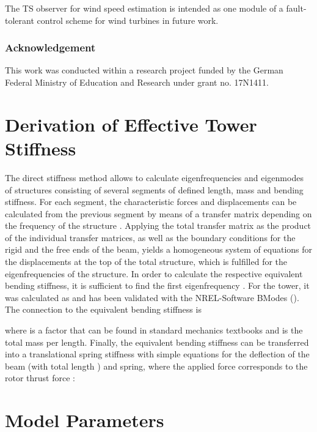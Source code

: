 \documentclass[a4paper]{article}
\begin{document}
The TS observer for wind speed estimation is intended as one module of a fault-tolerant control scheme for wind turbines in future work.





\subsubsection*{Acknowledgement}

This work was conducted within a research project funded by the German Federal Ministry of Education and Research under grant no. 17N1411.

\appendix

\section{\label{Sec_AppDirectStiffness}Derivation of Effective Tower Stiffness}

The direct stiffness method allows to calculate eigenfrequencies and eigenmodes of structures consisting of several segments of defined length, mass and bending stiffness. For each segment, the characteristic forces and displacements can be calculated from the previous segment by means of a transfer matrix depending on the frequency of the structure \cite{GaschKnothe2}. Applying the total transfer matrix as the product of the individual transfer matrices, as well as the boundary conditions for the rigid and the free ends of the beam, yields a homogeneous system of equations for the displacements at the top of the total structure, which is fulfilled for the eigenfrequencies of the structure.
In order to calculate the respective equivalent bending stiffness, it is sufficient to find the first eigenfrequency . For the tower, it was calculated as  and has been validated with the NREL-Software BModes \cite{BModes} (). The connection to the equivalent bending stiffness  is

where  is a factor that can be found in standard mechanics textbooks and  is the total mass per length.
Finally, the equivalent bending stiffness can be transferred into a translational spring stiffness with simple equations for the deflection  of the beam (with total length ) and spring, where the applied force  corresponds to the rotor thrust force :



\section{\label{Sec_AppModelParameters}Model Parameters}
\end{document}
